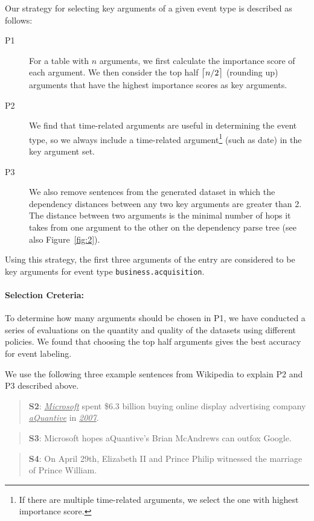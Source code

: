 Our strategy for selecting key arguments of a given event type is described as follows:
%
\begin{description}

\item [P1] For a \CVT table with $n$ arguments, we first calculate the importance score of each argument. We then consider the top half
    $\ceil[\big]{n/2}$ (rounding up) arguments that have the highest importance scores as key arguments.

\item [P2] We find that time-related arguments are useful in determining the event type, so we always include a time-related argument\footnote{If there are multiple time-related arguments, we select the one with highest importance score.}
    (such as date) in the key argument set.

\item [P3] We also remove sentences from the generated dataset in which the dependency distances between any two key arguments are
    greater than 2. The distance between two arguments is the minimal number of hops it takes from one argument to the other on the dependency parse tree (see also Figure~\ref{fig:2}).

\end{description}
%
Using this strategy, the first three arguments of the \CVT entry are considered to be key arguments for event type
\texttt{business.acquisition}.


\paragraph{Selection Creteria: }
To determine how many arguments should be chosen in P1, we have conducted a series of evaluations on the quantity and
quality of the datasets using different policies. We found that choosing the top half arguments %
gives the best accuracy for event labeling.

We use the following three example sentences from Wikipedia%
to explain P2 and P3 %
described above. %
%
\begin{quote}
\textbf{S2}: \underline{\emph{Microsoft}} spent \$6.3 billion buying online display advertising company \underline{\emph{aQuantive}} in
\underline{\emph{2007}}.
\end{quote}
\begin{quote}
\textbf{S3}: Microsoft hopes aQuantive's Brian McAndrews can outfox Google.
\end{quote}
\begin{quote}
\textbf{S4}: On April 29th, Elizabeth II and Prince Philip witnessed the marriage of Prince William.
\end{quote}

